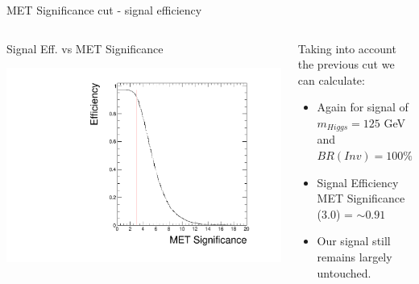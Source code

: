 \documentclass[8pt]{beamer}
\begin{document}
\begin{frame}{MET Significance cut - signal efficiency}
 
\begin{columns}
 
\begin{block}{Signal Eff. vs MET Significance}

\includegraphics[width=\linewidth]{img/DEta3p6/DEta3p6_metSigEff.pdf} 

\end{block}

\begin{block}{}

Taking into account the previous cut we can calculate:
\begin{itemize}
  \item Again for signal of $m_{Higgs}=125$ GeV and $BR(Inv)=100\%$ 
  \item Signal Efficiency MET Significance (3.0) = $\sim0.91$
  \item Our signal still remains largely untouched.
\end{itemize}

\end{block}

\end{columns}

\end{frame}
\end{document}
